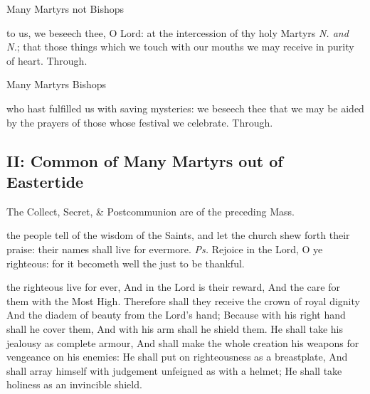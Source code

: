 \postcommunion\label{CommonMartyrsIPostcommunion}
\begin{inhead}
	Many Martyrs not Bishops
\end{inhead}
 to us, we beseech thee, O Lord: at the intercession of thy holy Martyrs \textit{N. and N.}; that those things which we touch with our mouths we may receive in purity of heart. Through.

\begin{inhead}
	Many Martyrs Bishops
\end{inhead}
 who hast fulfilled us with saving mysteries: we beseech thee that we may be aided by the prayers of those whose festival we celebrate. Through.


\subsection{II: Common of Many Martyrs out of Eastertide}\label{CommonMartyrsII}

\begin{rubric}
	The Collect, Secret, \& Postcommunion are of the preceding Mass.
\end{rubric}

\introit
{} the people tell of the wisdom of the Saints, and let the church shew forth their praise: their names shall live for evermore. \textit{Ps.} Rejoice in the Lord, O ye righteous: for it becometh well the just to be thankful.

\label{CommonMartyrsIIEpistle}
 the righteous live for ever, And in the Lord is their reward, And the care for them with the Most High. Therefore shall they receive the crown of royal dignity And the diadem of beauty from the Lord's hand; Because with his right hand shall he cover them, And with his arm shall he shield them. He shall take his jealousy as complete armour, And shall make the whole creation his weapons for vengeance on his enemies: He shall put on righteousness as a breastplate, And shall array himself with judgement unfeigned as with a helmet; He shall take holiness as an invincible shield.


